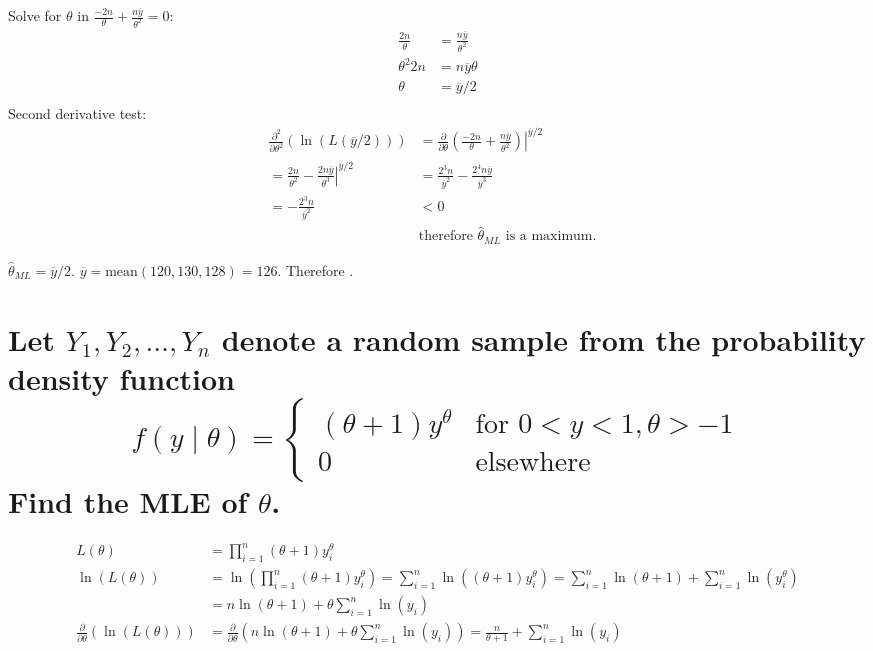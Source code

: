 \documentclass[10pt, letterpaper, titlepage]{article}
\newcommand*\eval[3]{\left.#1\right\rvert_{#2}^{#3}}
\newcommand{\my}{\overline{y}}
\begin{document}
        \begin{multicols}{2}
            Solve for $\theta$ in $\frac{-2n}{\theta} + \frac{n\my}{\theta^2} = 0$:
            \begin{align*}
                \frac{2n}{\theta} &= \frac{n\my}{\theta^2}\\
                \theta^2 2n &= n\my \theta\\
                \theta &= \my / 2\\
            \end{align*}
            Second derivative test:
            \begin{align*}
                \frac{\partial^2}{\partial\theta^2}(\ln(L(\my / 2)))
                &= \eval{\frac{\partial}{\partial\theta}(\frac{-2n}{\theta} + \frac{n\my}{\theta^2})}{}{\my /2}\\
                = \eval{\frac{2n}{\theta^2} - \frac{2n\my}{\theta^3}}{}{\my /2}
                &= \frac{2^3n}{\my^2} - \frac{2^4n\my}{\my^3}\\
                = -\frac{2^3 n}{\my^2} 
                &< 0 &\\ 
                &\text{therefore $\hat\theta_{ML}$ is a maximum.}
            \end{align*}
        \end{multicols}
        $\hat\theta_{ML} = \my /2 $. $\my = \text{mean}(120, 130, 128) = 126$. Therefore .

    \newpage
    \section[]{Let $Y_1,Y_2,\hdots,Y_n$ denote a random sample from the probability density function
        \[
            f(y\mid \theta) =
            \begin{cases}
                (\theta + 1)y^\theta &\text{for } 0<y<1, \theta > -1\\
                0 &\text{elsewhere}
            \end{cases}
        \]
        Find the MLE of $\theta$.}
        \begin{align*}
            L(\theta) 
            &= \prod_{i=1}^n (\theta + 1)y_i^\theta\\
            \ln(L(\theta)) 
            &= \ln(\prod_{i=1}^n(\theta + 1)y_i^\theta)
            = \sum_{i=1}^n \ln((\theta + 1)y_i^\theta)
            = \sum_{i=1}^n \ln(\theta + 1) + \sum_{i=1}^n \ln(y_i^\theta)\\
            &= n\ln(\theta + 1) + \theta \sum_{i=1}^n \ln(y_i)\\
            \frac{\partial}{\partial\theta}(\ln(L(\theta))) 
            &= \frac{\partial}{\partial\theta}(n\ln(\theta + 1) + \theta \sum_{i=1}^n \ln(y_i))
            = \frac{n}{\theta+1} + \sum_{i=1}^n \ln(y_i)
        \end{align*}
        
\end{document}

